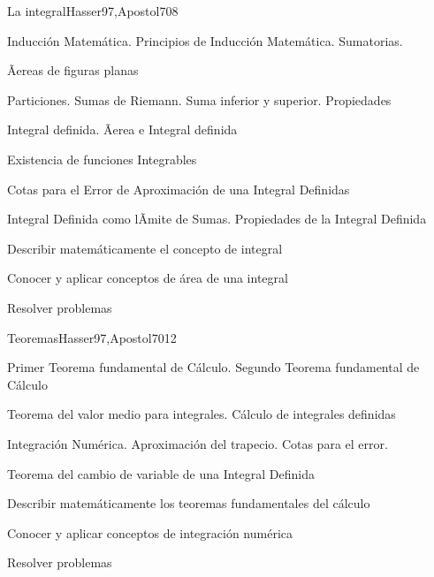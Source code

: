 \begin{syllabus}
\begin{unit}{La integral}{Hasser97,Apostol70}{8}
\begin{topics}
	\item Inducción Matemática. Principios de Inducción Matemática. Sumatorias.
	\item Ãereas de figuras planas
	\item Particiones. Sumas de Riemann. Suma inferior y superior. Propiedades
	\item Integral definida. Ãerea e Integral definida
	\item Existencia de funciones Integrables
	\item Cotas para el Error de Aproximación de una Integral Definidas
	\item Integral Definida como lÃ­mite de Sumas. Propiedades de la Integral Definida
\end{topics}
\begin{unitgoals}
	\item Describir matemáticamente el concepto de integral
	\item Conocer y aplicar conceptos de área de una integral
	\item Resolver problemas
\end{unitgoals}
\end{unit}

\begin{unit}{Teoremas}{Hasser97,Apostol70}{12}
\begin{topics}
      \item Primer Teorema fundamental de Cálculo. Segundo Teorema fundamental de Cálculo
      \item Teorema del valor medio para integrales. Cálculo de integrales definidas
      \item Integración Numérica. Aproximación del trapecio. Cotas para el error.
      \item Teorema del cambio de variable de una Integral Definida
\end{topics}

   \begin{unitgoals}
      \item Describir matemáticamente los teoremas fundamentales del cálculo
      \item Conocer y aplicar conceptos de integración numérica
	\item Resolver problemas
   \end{unitgoals}
\end{unit}


\end{syllabus}
